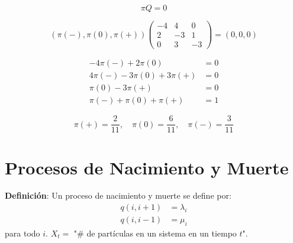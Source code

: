 \documentclass[12pt,a4paper]{article}
\newcommand{\definicion}[1]{%
\begin{definicionbox}
\textbf{Definición}: #1
\end{definicionbox}
}
\begin{document}
\begin{equation*}
\pi Q = 0
\end{equation*}

\begin{equation*}
(\pi(-), \pi(0), \pi(+)) \begin{pmatrix}
-4 & 4 & 0 \\
2 & -3 & 1 \\
0 & 3 & -3
\end{pmatrix} = (0, 0, 0)
\end{equation*}


\begin{align*}
-4\pi(-) + 2\pi(0) &= 0 \\
4\pi(-) - 3\pi(0) + 3\pi(+) &= 0 \\
\pi(0) - 3\pi(+) &= 0 \\
\pi(-) + \pi(0) + \pi(+) &= 1
\end{align*}

\begin{equation*}
\pi(+) = \frac{2}{11}, \quad \pi(0) = \frac{6}{11}, \quad \pi(-) = \frac{3}{11}
\end{equation*}


\section*{Procesos de Nacimiento y Muerte}

\definicion{Un proceso de nacimiento y muerte se define por:
\begin{align*}
q(i, i+1) &= \lambda_i \\
q(i, i-1) &= \mu_i
\end{align*}
para todo $i$. $X_t =$ "\# de partículas en un sistema en un tiempo $t$".}
\end{document}
